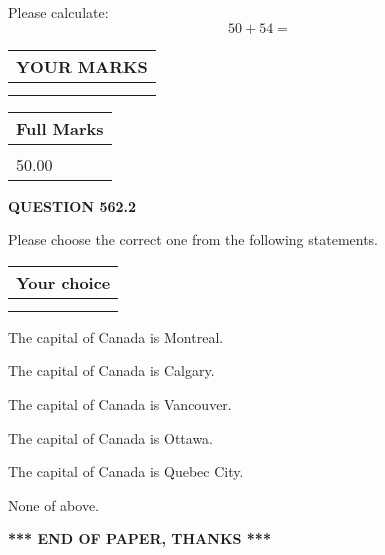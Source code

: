 \documentclass[12pt]{article}
\begin{document}
  
 
Please calculate:
\begin{equation}
50 +  %
54 = \nonumber
\end{equation}
 

 

 
  
\vspace{0.2in}
  
\noindent\begin{tabular}{|l|}
\hline
 YOUR MARKS  \\
\hline
 \\ 
 \\ 
\hline
\end{tabular}
\hspace{0.05in} \begin{tabular}{|l|}
\hline
 Full Marks  \\
\hline
 \\ 
50.00 \\
\hline
\end{tabular}
{\textbf{\Large{QUESTION
562.2 
}}}
  
  
Please choose the correct one from the following statements.
  
  
\noindent\hspace{3.0in} \begin{tabular}{|l|}
\hline
Your choice \\
\hline
 \\ 
 \\ 
\hline
\end{tabular}
  
  
 
 
The capital of Canada is Montreal.
 
 
The capital of Canada is Calgary.
 
 
The capital of Canada is Vancouver.
 
 
The capital of Canada is Ottawa.
 
 
The capital of Canada is Quebec City.
 
 
 None of above.
 
 
   
   
 \vspace{0.2in}
 
   
   
   
   
\vspace{1.0in} 
{\textbf{\large{ *** END OF PAPER, THANKS *** }}} 
   
\end{document}
